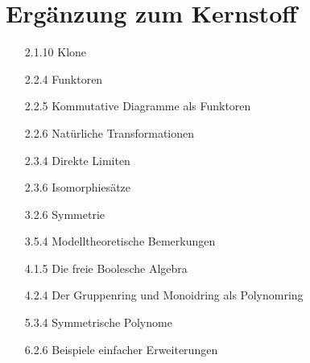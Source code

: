 \section{Ergänzung zum Kernstoff}

\begin{itemize}

  \item
  [2.1.10]
  Klone

  \item
  [2.2.4]
  Funktoren

  \item
  [2.2.5]
  Kommutative Diagramme als Funktoren

  \item
  [2.2.6]
  Natürliche Transformationen

  \item
  [2.3.4]
  Direkte Limiten

  \item
  [2.3.6]
  Isomorphiesätze

  \item
  [3.2.6]
  Symmetrie

  \item
  [3.5.4]
  Modelltheoretische Bemerkungen

  \item
  [4.1.5]
  Die freie Boolesche Algebra

  \item
  [4.2.4]
  Der Gruppenring und Monoidring als Polynomring

  \item
  [5.3.4]
  Symmetrische Polynome

  \item
  [6.2.6]
  Beispiele einfacher Erweiterungen

\end{itemize}
